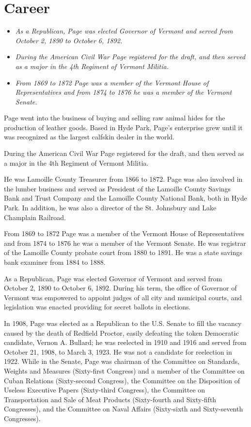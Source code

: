 \section{Career}\label{career}

\begin{itemize}
\item
  \emph{As a Republican, Page was elected Governor of Vermont and served
  from October 2, 1890 to October 6, 1892.}
\item
  \emph{During the American Civil War Page registered for the draft, and
  then served as a major in the 4th Regiment of Vermont Militia.}
\item
  \emph{From 1869 to 1872 Page was a member of the Vermont House of
  Representatives and from 1874 to 1876 he was a member of the Vermont
  Senate.}
\end{itemize}

Page went into the business of buying and selling raw animal hides for
the production of leather goods. Based in Hyde Park, Page's enterprise
grew until it was recognized as the largest calfskin dealer in the
world.

During the American Civil War Page registered for the draft, and then
served as a major in the 4th Regiment of Vermont Militia.

He was Lamoille County Treasurer from 1866 to 1872. Page was also
involved in the lumber business and served as President of the Lamoille
County Savings Bank and Trust Company and the Lamoille County National
Bank, both in Hyde Park. In addition, he was also a director of the St.
Johnsbury and Lake Champlain Railroad.

From 1869 to 1872 Page was a member of the Vermont House of
Representatives and from 1874 to 1876 he was a member of the Vermont
Senate. He was registrar of the Lamoille County probate court from 1880
to 1891. He was a state savings bank examiner from 1884 to 1888.

As a Republican, Page was elected Governor of Vermont and served from
October 2, 1890 to October 6, 1892. During his term, the office of
Governor of Vermont was empowered to appoint judges of all city and
municipal courts, and legislation was enacted providing for secret
ballots in elections.

In 1908, Page was elected as a Republican to the U.S. Senate to fill the
vacancy caused by the death of Redfield Proctor, easily defeating the
token Democratic candidate, Vernon A. Bullard; he was reelected in 1910
and 1916 and served from October 21, 1908, to March 3, 1923. He was not
a candidate for reelection in 1922. While in the Senate, Page was
chairman of the Committee on Standards, Weights and Measures
(Sixty-first Congress) and a member of the Committee on Cuban Relations
(Sixty-second Congress), the Committee on the Disposition of Useless
Executive Papers (Sixty-third Congress), the Committee on Transportation
and Sale of Meat Products (Sixty-fourth and Sixty-fifth Congresses), and
the Committee on Naval Affairs (Sixty-sixth and Sixty-seventh
Congresses).

